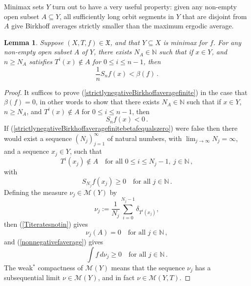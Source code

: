 \documentclass[reqno,11pt]{amsart}
\newtheorem{lem}[thm]{Lemma}
\theoremstyle{definition}
\theoremstyle{remark}
\theoremstyle{remark}
\def \N {\mathbb N}
\def\m{\mathcal M}
\def\X{\mathfrak{X}}
\numberwithin{equation}{section}
\begin{document}
Minimax sets $Y$ turn out to have a very useful property: given any non-empty open subset $A\subseteq Y$,
all sufficiently long orbit segments in $Y$ that are disjoint from $A$
give
Birkhoff averages strictly smaller than the maximum ergodic average.

\begin{lem}\label{minimaxnegativeBirkhoff}
Suppose $(X,T,f)\in\X$, and that $Y\subseteq X$ is minimax for $f$.
For any non-empty open subset $A$ of $Y$, there exists $N_A\in\N$ such that
if $x\in Y$, and $n\ge N_A$ 
satisfies $T^i(x)\notin A$ for $0\le i\le n-1$, then 
\begin{equation}\label{strictlynegativeBirkhoffaveragefinite}
\frac{1}{n} S_nf(x) < \beta(f)\,.
\end{equation}
\end{lem}
\begin{proof}
It suffices to prove (\ref{strictlynegativeBirkhoffaveragefinite}) in the case that $\beta(f)=0$, in other words to show
that there exists $N_A\in\N$ such that
if $x\in Y$, $n\ge N_A$, and $T^i(x)\notin A$ for $0\le i \le n-1$, then 
\begin{equation}\label{strictlynegativeBirkhoffaveragefinitebetafequalszero}
S_nf(x) < 0\,.
\end{equation}
If (\ref{strictlynegativeBirkhoffaveragefinitebetafequalszero}) were false then there would exist a sequence
$(N_j)_{j=1}^\infty$ of natural numbers, with $\lim_{j\to\infty} N_j=\infty$, and a sequence $x_j\in Y$, such that
\begin{equation}\label{Titeratesnotin}
T^i(x_j)\notin A\quad\text{for all }0\le i\le N_j-1,\ j\in\N\,,
\end{equation}
 with 
\begin{equation}\label{nonnegativefaverage}
S_{N_j}f(x_j)\ge0\quad\text{for all }j\in\N\,.
\end{equation}
Defining the measure $\nu_j\in\m(Y)$ by
$$
\nu_j:= \frac{1}{N_j}\sum_{i=0}^{N_j-1} \delta_{T^i(x_j)},
$$
then (\ref{Titeratesnotin}) gives
\begin{equation}\label{Titeratesnotinnuj}
\nu_j(A)=0 \quad\text{for all }j\in\N\,,
\end{equation}
and (\ref{nonnegativefaverage}) gives
\begin{equation}\label{nonnegativefaveragenuj}
\int f\, d\nu_j \ge0\quad\text{for all }j\in\N\,.
\end{equation}
The weak$^*$ compactness of $\m(Y)$ means that the sequence $\nu_j$ has a subsequential limit $\nu\in\m(Y)$,
and in fact $\nu\in\m(Y,T)$.

\end{proof}
\end{document}
